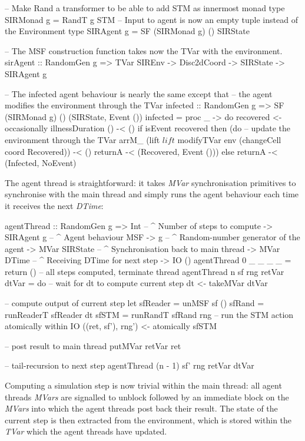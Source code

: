 \begin{HaskellCode}
-- Make Rand a transformer to be able to add STM as innermost monad
type SIRMonad g = RandT g STM
-- Input to agent is now an empty tuple instead of the Environment
type SIRAgent g = SF (SIRMonad g) () SIRState

-- The MSF construction function takes now the TVar with the environment.
sirAgent :: RandomGen g => TVar SIREnv -> Disc2dCoord -> SIRState -> SIRAgent g

-- The infected agent behaviour is nearly the same except that
-- the agent modifies the environment through the TVar
infected :: RandomGen g => SF (SIRMonad g) () (SIRState, Event ())
infected = proc _ -> do
  recovered <- occasionally illnessDuration () -< ()
  if isEvent recovered
    then (do
      -- update the environment through the TVar
      arrM_ (lift $ lift $ modifyTVar env (changeCell coord Recovered)) -< ()
      returnA -< (Recovered, Event ()))
    else returnA -< (Infected, NoEvent)
\end{HaskellCode}

The agent thread is straightforward: it takes \textit{MVar} synchronisation primitives to synchronise with the main thread and simply runs the agent behaviour each time it receives the next \textit{DTime}:

\begin{HaskellCode}
agentThread :: RandomGen g 
            => Int             -- ^ Number of steps to compute
            -> SIRAgent g      -- ^ Agent behaviour MSF
            -> g               -- ^ Random-number generator of the agent
            -> MVar SIRState   -- ^ Synchronisation back to main thread
            -> MVar DTime      -- ^ Receiving DTime for next step
            -> IO ()
agentThread 0 _ _ _ _ = return () -- all steps computed, terminate thread
agentThread n sf rng retVar dtVar = do
  -- wait for dt to compute current step
  dt <- takeMVar dtVar

  -- compute output of current step
  let sfReader = unMSF sf ()
      sfRand   = runReaderT sfReader dt
      sfSTM    = runRandT sfRand rng
  -- run the STM action atomically within IO
  ((ret, sf'), rng') <- atomically sfSTM 

  -- post result to main thread
  putMVar retVar ret
  
  -- tail-recursion to next step 
  agentThread (n - 1) sf' rng retVar dtVar
\end{HaskellCode}

Computing a simulation step is now trivial within the main thread: all agent threads \textit{MVars} are signalled to unblock followed by an immediate block on the \textit{MVars} into which the agent threads post back their result. The state of the current step is then extracted from the environment, which is stored within the \textit{TVar} which the agent threads have updated.


